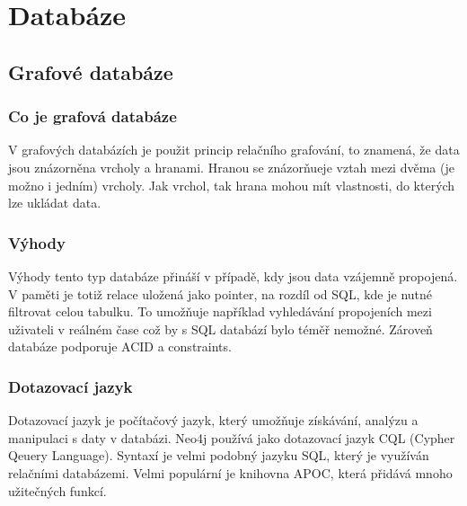 \chapter{Databáze}
\section{Grafové databáze}
\subsection{Co je grafová databáze}
V grafových databázích je použit princip relačního grafování, to znamená, že data jsou znázorněna vrcholy a hranami. Hranou se znázorňueje vztah mezi dvěma (je možno i jedním) vrcholy. Jak vrchol, tak hrana mohou mít vlastnosti, do kterých lze ukládat data.
\subsection{Výhody}
Výhody tento typ databáze přináší v případě, kdy jsou data vzájemně propojená. V paměti je totiž relace uložená jako pointer, na rozdíl od SQL, kde je nutné filtrovat celou tabulku. To umožňuje například vyhledávání propojeních mezi uživateli v reálném čase což by s SQL databází bylo téměř nemožné. Zároveň databáze podporuje ACID a constraints.
\subsection{Dotazovací jazyk}
Dotazovací jazyk je počítačový jazyk, který umožňuje získávání, analýzu a manipulaci s daty v databázi. Neo4j používá jako dotazovací jazyk CQL (Cypher Qeuery Language). Syntaxí je velmi podobný jazyku SQL, který je využíván relačními databázemi. Velmi populární je knihovna APOC, která přidává mnoho užitečných funkcí.
